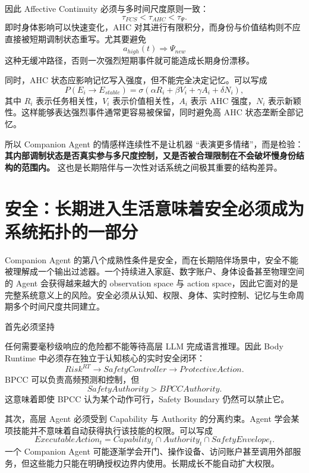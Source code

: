 因此 Affective Continuity 必须与多时间尺度原则一致：
\[
\tau_{FCS}
<
\tau_{AHC}
<
\tau_{\Psi}.
\]
即时身体影响可以快速变化，AHC 对其进行有限积分，而身份与价值结构则不应直接被短期调制状态重写。尤其要避免
\[
a_{high}(t)
\Rightarrow
\Psi_{new}
\]
这种无缓冲路径，否则一次强烈短期事件就可能造成长期身份漂移。

同时，AHC 状态应影响记忆写入强度，但不能完全决定记忆。可以写成
\[
P(E_i\rightarrow E_{stable})
=
\sigma
\left(
\alpha R_i+
\beta V_i+
\gamma A_i+
\delta N_i
\right),
\]
其中 $R_i$ 表示任务相关性，$V_i$ 表示价值相关性，$A_i$ 表示 AHC 强度，$N_i$ 表示新颖性。这样能够表达强烈事件通常更容易被保留，同时避免高 AHC 状态垄断全部记忆。

所以 Companion Agent 的情感样连续性不是让机器 ``表演更多情绪''，而是检验：\textbf{其内部调制状态是否真实参与多尺度控制，又是否被合理限制在不会破坏慢身份结构的范围内。} 这也是长期陪伴与一次性对话系统之间极其重要的结构差异。

\section{安全：长期进入生活意味着安全必须成为系统拓扑的一部分}

Companion Agent 的第八个成熟性条件是安全，而在长期陪伴场景中，安全不能被理解成一个输出过滤器。一个持续进入家庭、数字账户、身体设备甚至物理空间的 Agent 会获得越来越大的 observation space 与 action space，因此它面对的是完整系统意义上的风险。安全必须从认知、权限、身体、实时控制、记忆与生命周期多个时间尺度共同建立。

首先必须坚持
\begin{statementbox}
\centering
{}
\end{statementbox}
任何需要毫秒级响应的危险都不能等待高层 LLM 完成语言推理。因此 Body Runtime 中必须存在独立于认知核心的实时安全闭环：
\[
Risk^{RT}
\rightarrow
SafetyController
\rightarrow
ProtectiveAction .
\]
BPCC 可以负责高频预测和控制，但
\[
SafetyAuthority
>
BPCCAuthority.
\]
这意味着即使 BPCC 认为某个动作可行，Safety Boundary 仍然可以禁止它。

其次，高层 Agent 必须受到 Capability 与 Authority 的分离约束。Agent 学会某项技能并不意味着自动获得执行该技能的权限。可以写成
\[
ExecutableAction_t
=
Capability_t
\cap
Authority_t
\cap
SafetyEnvelope_t.
\]
一个 Companion Agent 可能逐渐学会开门、操作设备、访问账户甚至调用外部服务，但这些能力只能在明确授权边界内使用。长期成长不能自动扩大权限。

